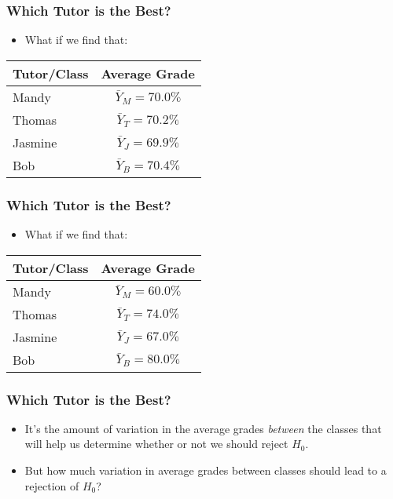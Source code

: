 \documentclass[12pt]{beamer}
\begin{document}
\begin{frame}
	\frametitle{Which Tutor is the Best?}
	
	\begin{itemize}[label={\color{blue}$\blacktriangleright$}]
		\item What if we find that:
	\end{itemize}
	
	\vspace{1em}
	
	\begin{center}
		\begin{tabular}{lc}
			\toprule
			Tutor/Class & Average Grade \\
			\midrule
			Mandy & $\bar{Y}_M = 70.0\%$ \\
			Thomas & $\bar{Y}_T = 70.2\%$ \\
			Jasmine & $\bar{Y}_J = 69.9\%$ \\
			Bob & $\bar{Y}_B = 70.4\%$ \\
			\bottomrule
		\end{tabular}
	\end{center}
	
\end{frame}
\begin{frame}
	\frametitle{Which Tutor is the Best?}
	
	\begin{itemize}[label={\color{blue}$\blacktriangleright$}]
		\item What if we find that:
	\end{itemize}
	
	\vspace{1em}
	
	\begin{center}
		\begin{tabular}{lc}
			\toprule
			Tutor/Class & Average Grade \\
			\midrule
			Mandy & $\bar{Y}_M = 60.0\%$ \\
			Thomas & $\bar{Y}_T = 74.0\%$ \\
			Jasmine & $\bar{Y}_J = 67.0\%$ \\
			Bob & $\bar{Y}_B = 80.0\%$ \\
			\bottomrule
		\end{tabular}
	\end{center}
	
\end{frame}
\begin{frame}
	\frametitle{Which Tutor is the Best?}
	
	\begin{itemize}[label={\color{blue}$\blacktriangleright$}]
		\item It's the amount of variation in the average grades \textit{between} the classes that will help us determine whether or not we should reject $H_0$.
		
		\item But how much variation in average grades between classes should lead to a rejection of $H_0$?
	\end{itemize}
	
\end{frame}
\end{document}
